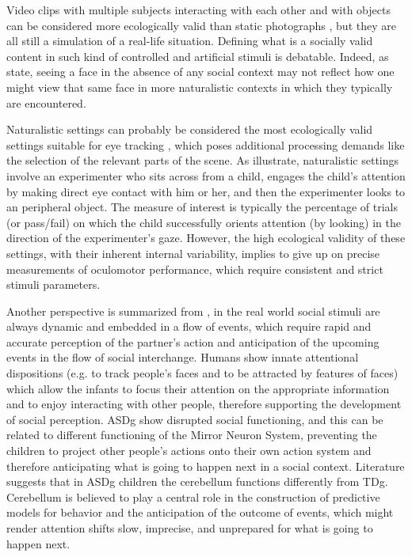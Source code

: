 Video clips with multiple subjects interacting with each other and with objects can be considered more ecologically valid than static photographs \citep{boraston2007eyetrackingASD}, but they are all still a simulation of a real-life situation. Defining what is a socially valid content in such kind of controlled and artificial stimuli is debatable. Indeed, as \cite[ p. 185]{bush2015socialattention} state, seeing a face in the absence of any social context may not reflect how one might view that same face in more naturalistic contexts in which they typically are encountered. 

Naturalistic settings can probably be considered the most ecologically valid settings suitable for eye tracking \cite[ p. 185]{bush2015socialattention}, which poses additional processing demands like the selection of the relevant parts of the scene. As \cite{birmingham2017gazeselection} illustrate, naturalistic settings involve an experimenter who sits across from a child, engages the child’s attention by making direct eye contact with him or her, and then the experimenter looks to an peripheral object. The measure of interest is typically the percentage of trials (or pass/fail) on which the child successfully orients attention (by looking) in the direction of the experimenter’s gaze. However, the high ecological validity of these settings, with their inherent internal variability, implies to give up on precise measurements of oculomotor performance, which require consistent and strict stimuli parameters.

Another perspective is summarized from \cite{vonhofsten2009lookingevents}, in the real world social stimuli are always dynamic and embedded in a flow of events, which require rapid and accurate perception of the partner’s action and anticipation of the upcoming events in the flow of social interchange. Humans show innate attentional dispositions (e.g. to track people’s faces and to be attracted by features of faces) which allow the infants to focus their attention on the appropriate information and to enjoy interacting with other people, therefore supporting the development of social perception. ASDg show disrupted social functioning, and this can be related to different functioning of the Mirror Neuron System, preventing the children to project other people’s actions onto their own action system and therefore anticipating what is going to happen next in a social context. Literature suggests that in ASDg children the cerebellum functions differently from TDg. Cerebellum is believed to play a central role in the construction of predictive models for behavior and the anticipation of the outcome of events, which might render attention shifts slow, imprecise, and unprepared for what is going to happen next.

